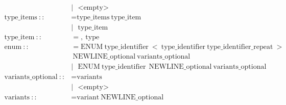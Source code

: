 \documentclass[a4paper,12pt]{book} %
\begin{document}
\begin{align*}
                                      & |\ \ \ \text{<empty>}                                                                                                                                                                                                     \\
  \text{type\_items}\ ::              & = \text{type\_items}\ \text{type\_item}                                                                                                                                                                                   \\
                                      & |\ \ \ \text{type\_item}                                                                                                                                                                                                  \\
  \text{type\_item}\ ::               & = ,\ \text{type}                                                                                                                                                                                                          \\
  \text{enum}\ ::                     & = \text{ENUM}\ \text{type\_identifier}\ <\ \text{type\_identifier}\ \text{type\_identifier\_repeat}\ > \\ &  {\ \text{NEWLINE\_optional}\ \text{variants\_optional}\ }                                                         \\
                                      & |\ \ \ \text{ENUM}\ \text{type\_identifier}\ {\ \text{NEWLINE\_optional}\ \text{variants\_optional}\ }                                                                                                                    \\
  \text{variants\_optional}\ ::       & = \text{variants}                                                                                                                                                                                                         \\
                                      & |\ \ \ \text{<empty>}                                                                                                                                                                                                     \\
  \text{variants}\ ::                 & = \text{variant}\ \text{NEWLINE\_optional}                                                                                                                                                                                \\

\end{align*}
\end{document}
